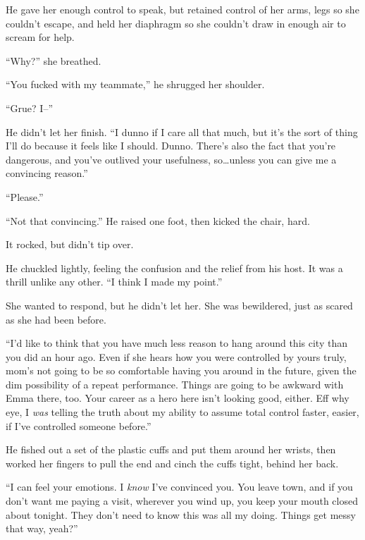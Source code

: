 He gave her enough control to speak, but retained control of her arms, legs so she couldn't escape, and held her diaphragm so she couldn't draw in enough air to scream for help.



``Why?'' she breathed.



``You fucked with my teammate,'' he shrugged her shoulder.



``Grue?  I--''



He didn't let her finish.  ``I dunno if I care all that much, but it's the sort of thing I'll do because it feels like I should.  Dunno.  There's also the fact that you're dangerous, and you've outlived your usefulness, so\ldots unless you can give me a convincing reason.''



``Please.''



``Not that convincing.''  He raised one foot, then kicked the chair, hard.



It rocked, but didn't tip over.



He chuckled lightly, feeling the confusion and the relief from his host.  It was a thrill unlike any other.  ``I think I made my point.''



She wanted to respond, but he didn't let her.  She was bewildered, just as scared as she had been before.



``I'd like to think that you have much less reason to hang around this city than you did an hour ago.  Even if she hears how you were controlled by yours truly, mom's not going to be so comfortable having you around in the future, given the dim possibility of a repeat performance.  Things are going to be awkward with Emma there, too.  Your career as a hero here isn't looking good, either.  Eff why eye, I \emph{was} telling the truth about my ability to assume total control faster, easier, if I've controlled someone before.''



He fished out a set of the plastic cuffs and put them around her wrists, then worked her fingers to pull the end and cinch the cuffs tight, behind her back.



``I can feel your emotions.  I \emph{know} I've convinced you.  You leave town, and if you don't want me paying a visit, wherever you wind up, you keep your mouth closed about tonight.  They don't need to know this was all my doing.  Things get messy that way, yeah?''



